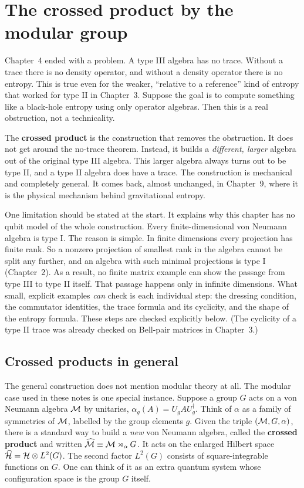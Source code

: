 \chapter{The crossed product by the modular group}

Chapter~4 ended with a problem. A type III algebra has no trace. Without a trace there is no density operator,
and without a density operator there is no entropy. This is true even for the weaker, ``relative to a
reference'' kind of entropy that worked for type II in Chapter~3. Suppose the goal is to compute something like
a black-hole entropy using only operator algebras. Then this is a real obstruction, not a technicality.

The \textbf{crossed product} is the construction that removes the obstruction. It does not get around the
no-trace theorem. Instead, it builds a \emph{different, larger} algebra out of the original type III algebra.
This larger algebra always turns out to be type II, and a type II algebra does have a trace. The construction
is mechanical and completely general. It comes back, almost unchanged, in Chapter~9, where it is the physical
mechanism behind gravitational entropy.

One limitation should be stated at the start. It explains why this chapter has no qubit model of the whole
construction. Every finite-dimensional von Neumann algebra is type I. The reason is simple. In finite
dimensions every projection has finite rank. So a nonzero projection of smallest rank in the algebra cannot be
split any further, and an algebra with such minimal projections is type I (Chapter~2). As a result, no finite
matrix example can show the passage from type III to type II itself. That passage happens only in infinite
dimensions. What small, explicit examples \emph{can} check is each individual step: the dressing condition, the
commutator identities, the trace formula and its cyclicity, and the shape of the entropy formula. These steps
are checked explicitly below. (The cyclicity of a type II trace was already checked on Bell-pair matrices in
Chapter~3.)

\section{Crossed products in general}

The general construction does not mention modular theory at all. The modular case used in these notes is one
special instance. Suppose a group $G$ acts on a von Neumann algebra $\mathcal{M}$ by unitaries,
$\alpha_g(A)=U_gAU_g^\dagger$. Think of $\alpha$ as a family of symmetries of $\mathcal{M}$, labelled by the group
elements $g$. Given the triple $(\mathcal{M},G,\alpha)$, there is a standard way to build a \emph{new} von Neumann
algebra, called the \textbf{crossed product} and written $\widehat{\mathcal{M}}\equiv\mathcal{M}\rtimes_\alpha G$. It acts on the
enlarged Hilbert space $\widehat{\mathcal{H}}=\mathcal{H}\otimes L^2(G)$. The second factor $L^2(G)$ consists of square-integrable
functions on $G$. One can think of it as an extra quantum system whose configuration space is the group $G$
itself.

